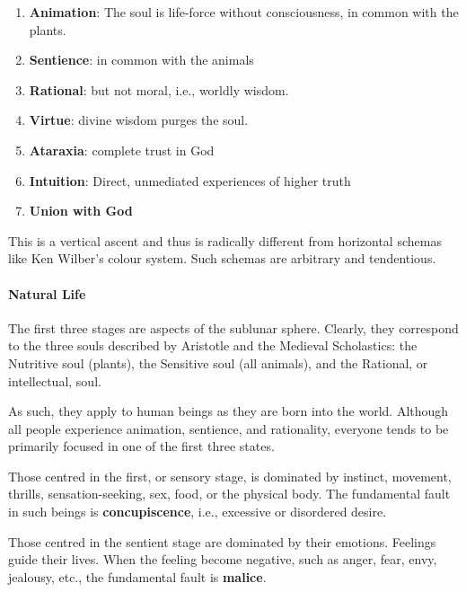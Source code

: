 \begin{enumerate}


\item \textbf{Animation}: The soul is life-force without consciousness, in common with the plants.

\item \textbf{Sentience}: in common with the animals


\item \textbf{Rational}: but not moral, i.e., worldly wisdom.


\item \textbf{Virtue}: divine wisdom purges the soul.


\item \textbf{Ataraxia}: complete trust in God


\item \textbf{Intuition}: Direct, unmediated experiences of higher truth


\item \textbf{Union with God}

\end{enumerate}


This is a vertical ascent and thus is radically different from horizontal schemas like Ken Wilber's colour system. Such schemas are arbitrary and tendentious.

\paragraph{Natural Life}


The first three stages are aspects of the sublunar sphere. Clearly, they correspond to the three souls described by Aristotle and the Medieval Scholastics: the Nutritive soul (plants), the Sensitive soul (all animals), and the Rational, or intellectual, soul.

As such, they apply to human beings as they are born into the world. Although all people experience animation, sentience, and rationality, everyone tends to be primarily focused in one of the first three states.

Those centred in the first, or sensory stage, is dominated by instinct, movement, thrills, sensation-seeking, sex, food, or the physical body. The fundamental fault in such beings is \textbf{concupiscence}, i.e., excessive or disordered desire.

Those centred in the sentient stage are dominated by their emotions. Feelings guide their lives. When the feeling become negative, such as anger, fear, envy, jealousy, etc., the fundamental fault is
\textbf{malice}.


